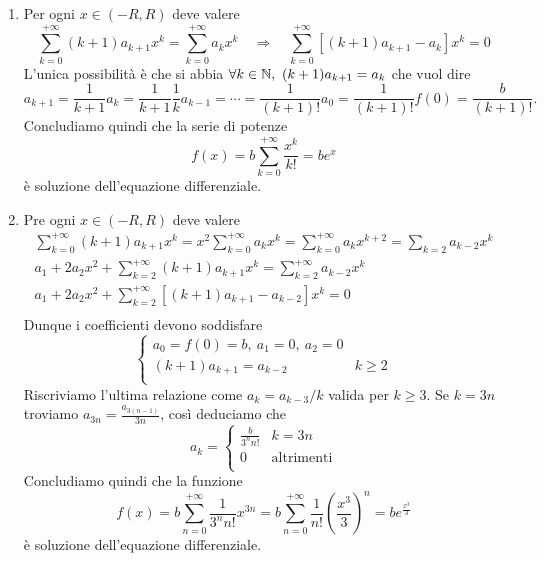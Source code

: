 \documentclass[a4paper]{article}\par \usepackage{style}\par
\begin{document}
\begin{enumerate}[label = (\roman*)]
\item Per ogni $ x \in (-R, R) $ deve valere
  \begin{equation*}
    \sum_{k = 0}^{+\infty} (k + 1) a_{k + 1} x^k = \sum_{k = 0}^{+\infty} a_k x^k \quad \Rightarrow \quad \sum_{k = 0}^{+\infty} [(k + 1) a_{k + 1} - a_k] x^{k} = 0
  \end{equation*}
  L'unica possibilità è che si abbia $ \forall k \in \mathbb{N}, \ (k + 1) a_{k + 1} = a_k $ che vuol dire \[a_{k + 1} = \frac{1}{k + 1} a_k = \frac{1}{k + 1} \frac{1}{k} a_{k  - 1} = \cdots = \frac{1}{(k + 1)!} a_0 = \frac{1}{(k + 1)!} f(0) = \frac{b}{(k + 1)!}.\] Concludiamo quindi che la serie di potenze \[f(x) = b \sum_{k = 0}^{+\infty} \frac{x^k}{k!} = b e^x\] è soluzione dell'equazione differenziale.
\item Pre ogni $ x \in (-R, R) $ deve valere
  \begin{gather*}
    \sum_{k = 0}^{+\infty} (k + 1) a_{k + 1} x^k = x^2 \sum_{k = 0}^{+\infty} a_k x^k = \sum_{k = 0}^{+\infty} a_k x^{k + 2} = \sum_{k = 2} a_{k - 2} x^k \\
    a_1  + 2 a_2 x^2 + \sum_{k = 2}^{+\infty} (k + 1) a_{k + 1} x^k = \sum_{k = 2}^{+\infty} a_{k - 2} x^k \\
    a_1  + 2 a_2 x^2 + \sum_{k = 2}^{+\infty} \left[(k + 1) a_{k + 1} - a_{k - 2}\right] x^k = 0 \\
  \end{gather*}
  Dunque i coefficienti devono soddisfare
  \begin{equation*}
    \begin{cases}
      a_0 = f(0) = b, \ a_1 = 0, \ a_2 = 0 \\
      (k + 1) a_{k + 1} = a_{k - 2} & k \geq 2 \\
    \end{cases}
  \end{equation*}
  Riscriviamo l'ultima relazione come $ a_k = a_{k - 3} / k $ valida per $ k \geq 3 $. Se $ k = 3n $ troviamo $ a_{3n} = \frac{a_{3(n - 1)}}{3n} $, così deduciamo che
  \begin{equation*}
    a_k =
    \begin{cases}
      \frac{b}{3^{n} n!} & k = 3n \\
      0 & \text{altrimenti} \\
    \end{cases}
  \end{equation*}
  Concludiamo quindi che la funzione \[f(x) = b \sum_{n = 0}^{+\infty}\frac{1}{3^n n!} x^{3n} = b \sum_{n = 0}^{+\infty}\frac{1}{n!} \left(\frac{x^3}{3}\right)^{n} = b e^{\frac{x^3}{3}}\] è soluzione dell'equazione differenziale.

\end{enumerate}
\end{document}
